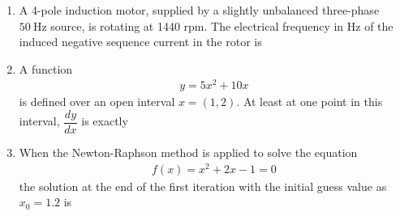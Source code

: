 \documentclass[journal,12pt,onecolumn]{IEEEtran}
\theoremstyle{remark}
\begin{document}
\begin{enumerate}
\begin{enumerate}
\end{enumerate}


\item A 4-pole induction motor, supplied by a slightly unbalanced three-phase $50\ \text{Hz}$ source, is rotating at 1440 rpm. The electrical frequency in Hz of the induced negative sequence current in the rotor is

\begin{enumerate}
\end{enumerate}


\item A function 
\begin{align*}
    y = 5x^2 + 10x
\end{align*}
is defined over an open interval $x=(1,2)$. At least at one point in this interval, $\dfrac{dy}{dx}$ is exactly

\begin{enumerate}
\end{enumerate}


\item When the Newton-Raphson method is applied to solve the equation \begin{align*}
    f(x) = x^2 + 2x - 1 = 0
\end{align*}
the solution at the end of the first iteration with the initial guess value as $x_0 = 1.2$ is

\begin{enumerate}
\end{enumerate}


\end{enumerate}
\end{document}
